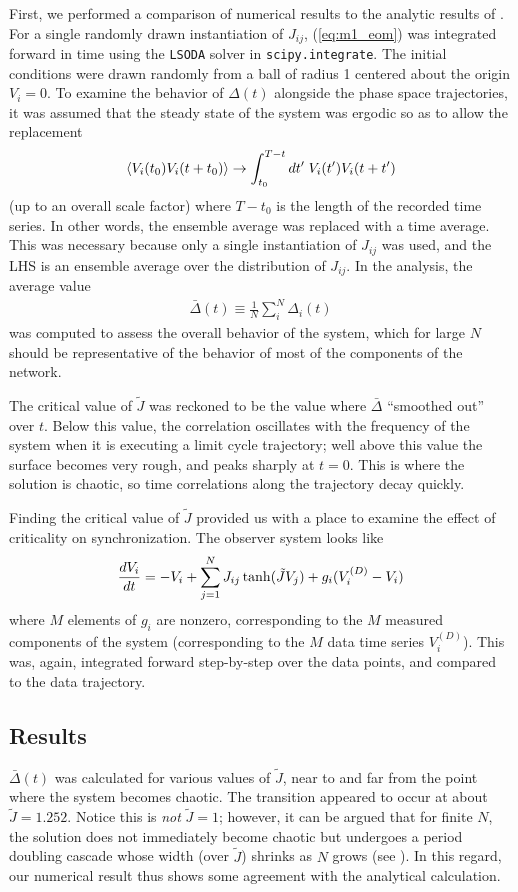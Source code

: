 \documentclass{article} %
\begin{document}
First, we performed a comparison of numerical results to the analytic results of \cite{Sompolinsky1988}.  For a single randomly drawn instantiation of $J_{ij}$, (\ref{eq:m1_eom}) was integrated forward in time using the \texttt{LSODA} solver in \texttt{scipy.integrate}.  The initial conditions were drawn randomly from a ball of radius 1 centered about the origin $V_i=0$.  To examine the behavior of $\Delta(t)$ alongside the phase space trajectories, it was assumed that the steady state of the system was ergodic so as to allow the replacement
\begin{align*}
	\left\langle V_i(t_0)V_i(t+t_0) \right\rangle \rightarrow \int_{t_0}^{T-t} dt^{\prime} \; V_i(t^{\prime}) V_i(t+t^{\prime})
\end{align*}
(up to an overall scale factor) where $T-t_0$ is the length of the recorded time series.  In other words, the ensemble average was replaced with a time average.  This was necessary because only a single instantiation of $J_{ij}$ was used, and the LHS is an ensemble average over the distribution of $J_{ij}$.  In the analysis, the average value
\begin{align}
	\bar{\Delta}(t) \equiv \frac{1}{N} \sum_i^N \Delta_i(t)
\end{align}
was computed to assess the overall behavior of the system, which for large $N$ should be representative of the behavior of most of the components of the network.

The critical value of $\tilde{J}$ was reckoned to be the value where $\bar{\Delta}$ ``smoothed out'' over $t$.  Below this value, the correlation oscillates with the frequency of the system when it is executing a limit cycle trajectory; well above this value the surface becomes very rough, and peaks sharply at $t=0$.  This is where the solution is chaotic, so time correlations along the trajectory decay quickly.

Finding the critical value of $\tilde{J}$ provided us with a place to examine the effect of criticality on synchronization. The observer system looks like
\begin{align}
	\frac{d V_i}{d t} = -V_i + \sum_{j=1}^{N} J_{ij} \tanh(\tilde{J} V_j) + g_i (V^{(D)}_i - V_i)
\end{align}
where $M$ elements of $g_i$ are nonzero, corresponding to the $M$ measured components of the system (corresponding to the $M$ data time series $V_i^{(D)}$).  This was, again, integrated forward step-by-step over the data points, and compared to the data trajectory.

\subsection{Results}
$\bar{\Delta}(t)$ was calculated for various values of $\tilde{J}$, near to and far from the point where the system becomes chaotic.  The transition appeared to occur at about $\tilde{J} = 1.252$.  Notice this is \emph{not} $\tilde{J}=1$; however, it can be argued that for finite $N$, the solution does not immediately become chaotic but undergoes a period doubling cascade whose width (over $\tilde{J}$) shrinks as $N$ grows (see \cite{Sompolinsky1988}).  In this regard, our numerical result thus shows some agreement with the analytical calculation.
\end{document}
